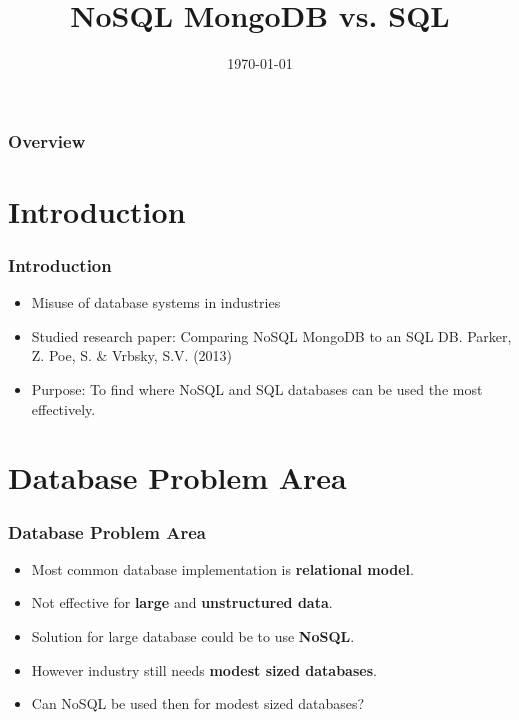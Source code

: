 \documentclass{beamer}
\title[NoSQL MongoDB vs. SQL ]{NoSQL MongoDB vs. SQL}
\author{}
\institute[UP]{
	Department of Computer Science, University of Pretoria
}
\date{\today}
\begin{document}
\begin{frame}
	\titlepage
\end{frame}

\begin{frame}
	\frametitle{Overview}
	\tableofcontents
\end{frame}

	\section{Introduction}
		\begin{frame}
		\frametitle{Introduction}
	        \begin{itemize}
	            \item Misuse of database systems in industries 
				\item Studied research paper: Comparing NoSQL MongoDB to an SQL DB. Parker, Z. Poe, S. & Vrbsky, S.V. (2013)
				\item Purpose: To find where NoSQL and SQL databases can be used the most effectively.
			\end{itemize}
		\end{frame}
	
	\section{Database Problem Area}
		\begin{frame}
		\frametitle{Database Problem Area}
            \begin{itemize}
	            \item Most common database implementation is \textbf{relational model}.
				\item Not effective for \textbf{large} and \textbf{unstructured data}.
				\item Solution for large database could be to use \textbf{NoSQL}.
				\item However industry still needs \textbf{modest sized databases}.
				\item Can NoSQL be used then for modest sized databases?
			\end{itemize}
		\end{frame}
			
\end{document}
